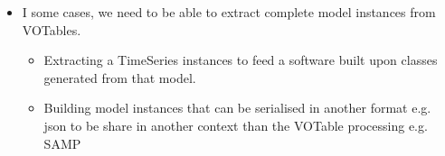 \begin{itemize}
  \item I some cases, we need to be able to extract complete model instances from VOTables.
    \begin{itemize}
      \item Extracting a TimeSeries instances to feed a software built upon classes generated from that model.
      \item Building model instances that can be serialised in another format e.g. json to be share in another context than the VOTable processing e.g. SAMP
   \end{itemize}          
    
\end{itemize} 


